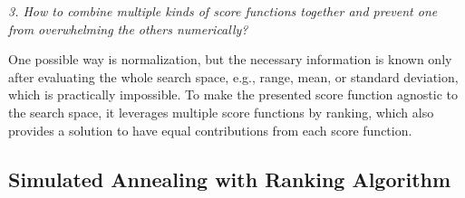 \documentclass[sigconf]{acmart}
\begin{document}
    \textit{3. How to combine multiple kinds of score functions together 
    and prevent one from overwhelming the others numerically?}
    
    One possible way is normalization, but the necessary information is known only 
    after evaluating the whole search space, e.g., range, mean, or standard deviation, 
    which is practically impossible. To make the presented score function 
    agnostic to the search space, it leverages multiple score functions by ranking, 
    which also provides a solution to have equal contributions from each score function. 

    \subsection{Simulated Annealing with Ranking Algorithm}
    
\end{document}
